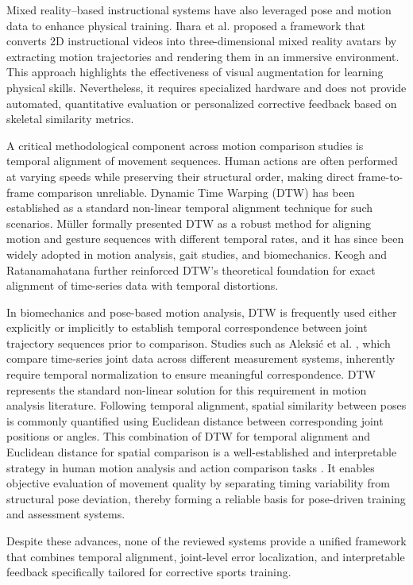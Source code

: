 \documentclass[12pt, a4paper]{report}
\begin{document}
Mixed reality–based instructional systems have also leveraged pose and motion data to enhance physical training. Ihara et al. \cite{ihara} proposed a framework that converts 2D instructional videos into three-dimensional mixed reality avatars by extracting motion trajectories and rendering them in an immersive environment. This approach highlights the effectiveness of visual augmentation for learning physical skills. Nevertheless, it requires specialized hardware and does not provide automated, quantitative evaluation or personalized corrective feedback based on skeletal similarity metrics.

A critical methodological component across motion comparison studies is temporal alignment of movement sequences. Human actions are often performed at varying speeds while preserving their structural order, making direct frame-to-frame comparison unreliable. Dynamic Time Warping (DTW) has been established as a standard non-linear temporal alignment technique for such scenarios. Müller \cite{muller} formally presented DTW as a robust method for aligning motion and gesture sequences with different temporal rates, and it has since been widely adopted in motion analysis, gait studies, and biomechanics. Keogh and Ratanamahatana \cite{keogh} further reinforced DTW's theoretical foundation for exact alignment of time-series data with temporal distortions.

In biomechanics and pose-based motion analysis, DTW is frequently used either explicitly or implicitly to establish temporal correspondence between joint trajectory sequences prior to comparison. Studies such as Aleksić et al. \cite{aleksic}, which compare time-series joint data across different measurement systems, inherently require temporal normalization to ensure meaningful correspondence. DTW represents the standard non-linear solution for this requirement in motion analysis literature. Following temporal alignment, spatial similarity between poses is commonly quantified using Euclidean distance between corresponding joint positions or angles. This combination of DTW for temporal alignment and Euclidean distance for spatial comparison is a well-established and interpretable strategy in human motion analysis and action comparison tasks \cite{muller, generic_dtw}. It enables objective evaluation of movement quality by separating timing variability from structural pose deviation, thereby forming a reliable basis for pose-driven training and assessment systems.

Despite these advances, none of the reviewed systems provide a unified framework that combines temporal alignment, joint-level error localization, and interpretable feedback specifically tailored for corrective sports training.
\end{document}
